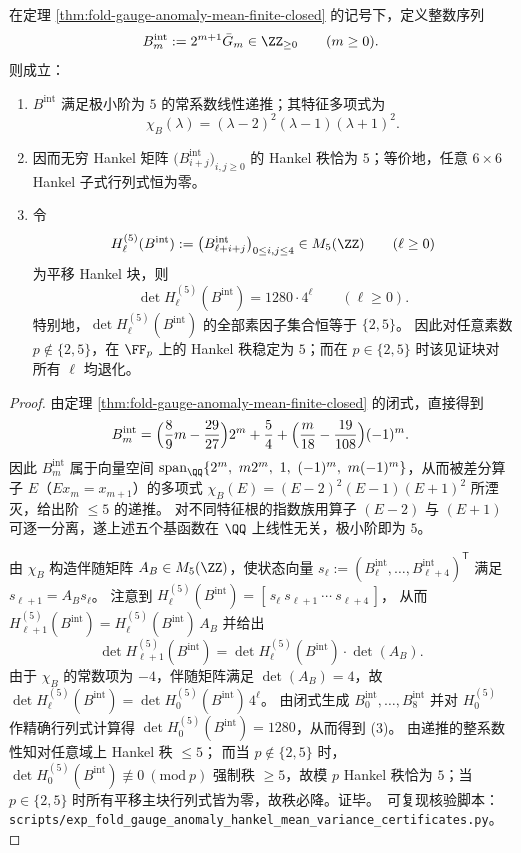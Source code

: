 \begin{theorem}\label{thm:fold-gauge-anomaly-mean-hankel-rigidity-rank5-badprimes}
在定理 \ref{thm:fold-gauge-anomaly-mean-finite-closed} 的记号下，定义整数序列
\[
B_m^{\mathrm{int}}:=2^{m+1}\bar G_m\in\ZZ_{\ge 0}\qquad(m\ge 0).
\]
则成立：
\begin{enumerate}
  \item \(B^{\mathrm{int}}\) 满足极小阶为 \(5\) 的常系数线性递推；其特征多项式为
  \[
  \chi_{B}(\lambda)=(\lambda-2)^2(\lambda-1)(\lambda+1)^2.
  \]
  \item 因而无穷 Hankel 矩阵 \(\bigl(B^{\mathrm{int}}_{i+j}\bigr)_{i,j\ge 0}\) 的 Hankel 秩恰为 \(5\)；等价地，任意 \(6\times 6\) Hankel 子式行列式恒为零。
  \item 令
  \[
  H^{(5)}_{\ell}(B^{\mathrm{int}}):=\bigl(B^{\mathrm{int}}_{\ell+i+j}\bigr)_{0\le i,j\le 4}\in M_5(\ZZ)
  \qquad(\ell\ge 0)
  \]
  为平移 Hankel 块，则
  \[
  \det H^{(5)}_{\ell}(B^{\mathrm{int}})=1280\cdot 4^{\ell}\qquad(\ell\ge 0).
  \]
  特别地，\(\det H^{(5)}_{\ell}(B^{\mathrm{int}})\) 的全部素因子集合恒等于 \(\{2,5\}\)。
  因此对任意素数 \(p\notin\{2,5\}\)，在 \(\FF_p\) 上的 Hankel 秩稳定为 \(5\)；而在 \(p\in\{2,5\}\) 时该见证块对所有 \(\ell\) 均退化。
\end{enumerate}
\end{theorem}
\begin{proof}
由定理 \ref{thm:fold-gauge-anomaly-mean-finite-closed} 的闭式，直接得到
\[
B_m^{\mathrm{int}}
=\Bigl(\frac{8}{9}m-\frac{29}{27}\Bigr)2^{m}+\frac54+\Bigl(\frac{m}{18}-\frac{19}{108}\Bigr)(-1)^m.
\]
因此 \(B_m^{\mathrm{int}}\) 属于向量空间
\(
\mathrm{span}_{\QQ}\{2^m,\ m2^m,\ 1,\ (-1)^m,\ m(-1)^m\}
\)，从而被差分算子 \(E\)（\(Ex_m=x_{m+1}\)）的多项式
\(
\chi_B(E)=(E-2)^2(E-1)(E+1)^2
\)
所湮灭，给出阶 \(\le 5\) 的递推。
对不同特征根的指数族用算子 \((E-2)\) 与 \((E+1)\) 可逐一分离，遂上述五个基函数在 \(\QQ\) 上线性无关，极小阶即为 \(5\)。
\par
由 \(\chi_B\) 构造伴随矩阵 \(A_B\in M_5(\ZZ)\)，使状态向量
\(
s_\ell:=(B^{\mathrm{int}}_{\ell},\dots,B^{\mathrm{int}}_{\ell+4})^{\mathsf T}
\)
满足 \(s_{\ell+1}=A_B s_\ell\)。
注意到
\(
H^{(5)}_{\ell}(B^{\mathrm{int}})=[\,s_\ell\ s_{\ell+1}\ \cdots\ s_{\ell+4}\,]
\)，
从而
\(
H^{(5)}_{\ell+1}(B^{\mathrm{int}})=H^{(5)}_{\ell}(B^{\mathrm{int}})\,A_B
\)
并给出
\[
\det H^{(5)}_{\ell+1}(B^{\mathrm{int}})=\det H^{(5)}_{\ell}(B^{\mathrm{int}})\cdot \det(A_B).
\]
由于 \(\chi_B\) 的常数项为 \(-4\)，伴随矩阵满足 \(\det(A_B)=4\)，故
\(
\det H^{(5)}_{\ell}(B^{\mathrm{int}})=\det H^{(5)}_{0}(B^{\mathrm{int}})\,4^\ell
\)。
由闭式生成 \(B^{\mathrm{int}}_0,\dots,B^{\mathrm{int}}_8\) 并对 \(H^{(5)}_0\) 作精确行列式计算得 \(\det H^{(5)}_0(B^{\mathrm{int}})=1280\)，从而得到 (3)。
由递推的整系数性知对任意域上 Hankel 秩 \(\le 5\)；
而当 \(p\notin\{2,5\}\) 时，\(\det H^{(5)}_0(B^{\mathrm{int}})\not\equiv 0\ (\mathrm{mod}\ p)\) 强制秩 \(\ge 5\)，故模 \(p\) Hankel 秩恰为 \(5\)；当 \(p\in\{2,5\}\) 时所有平移主块行列式皆为零，故秩必降。证毕。\
可复现核验脚本：\texttt{scripts/exp\_fold\_gauge\_anomaly\_hankel\_mean\_variance\_certificates.py}。
\end{proof}


